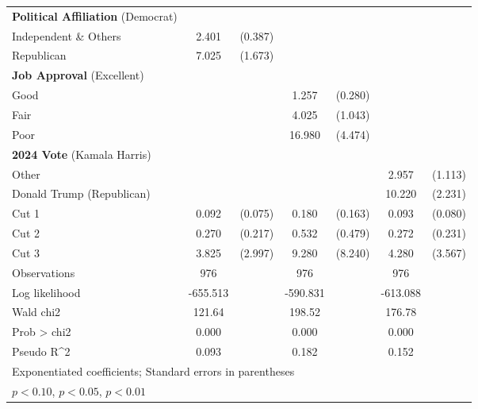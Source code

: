 \begin{table}[htbp]
\begin{tabular}{l*{3}{cc}}
\textbf{Political Affiliation} (Democrat)& & &  &  &     &  \\
Independent \& Others&       2.401\sym{***}&     (0.387)&                     &            &                     &            \\
Republican          &       7.025\sym{***}&     (1.673)&                     &            &                     &            \\

\textbf{Job Approval} (Excellent) & & &  &  &     &  \\
Good                &                     &            &       1.257         &     (0.280)&                     &            \\
Fair                &                     &            &       4.025\sym{***}&     (1.043)&                     &            \\
Poor                &                     &            &      16.980\sym{***}&     (4.474)&                     &            \\
\textbf{2024 Vote} (Kamala Harris) & & &  &  &     &  \\
Other              &                     &            &                     &            &       2.957\sym{***}&     (1.113)\\

Donald Trump (Republican)&                     &            &                     &            &      10.220\sym{***}&     (2.231)\\
Cut 1               &       0.092\sym{***}&     (0.075)&       0.180\sym{*}  &     (0.163)&       0.093\sym{***}&     (0.080)\\
Cut 2               &       0.270         &     (0.217)&       0.532         &     (0.479)&       0.272         &     (0.231)\\
Cut 3               &       3.825\sym{*}  &     (2.997)&       9.280\sym{**} &     (8.240)&       4.280\sym{*}  &     (3.567)\\
\hline
Observations        &         976         &            &         976         &            &         976         &            \\
Log likelihood      &    -655.513         &            &    -590.831         &            &    -613.088         &            \\
Wald chi2           &      121.64         &            &      198.52         &            &      176.78         &            \\
Prob > chi2         &       0.000         &            &       0.000         &            &       0.000         &            \\
Pseudo R^2          &       0.093         &            &       0.182         &            &       0.152         &            \\
\hline\hline
\multicolumn{7}{l}{\footnotesize Exponentiated coefficients; Standard errors in parentheses}\\
\multicolumn{7}{l}{\footnotesize \sym{*} \(p<0.10\), \sym{**} \(p<0.05\), \sym{***} \(p<0.01\)}\\
\end{tabular}
\end{table}
